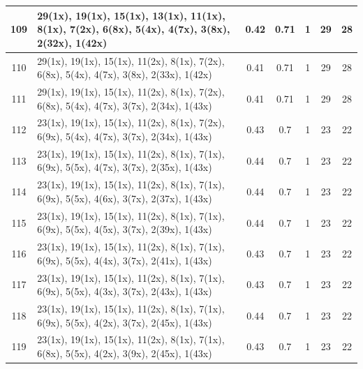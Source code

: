 \begin{small}
\begin{longtable}{|c|p{4cm}|c|c|c|c|c|}
  109 & 29(1x), 19(1x), 15(1x), 13(1x), 11(1x), 8(1x), 7(2x), 6(8x), 5(4x), 4(7x), 3(8x), 2(32x), 1(42x) & \cellcolor{colorGood}  0.42 & \cellcolor{colorGood} 0.71 & 1 & 29 & \cellcolor{colorBad} 28 \\   \hline
  110 & 29(1x), 19(1x), 15(1x), 11(2x), 8(1x), 7(2x), 6(8x), 5(4x), 4(7x), 3(8x), 2(33x), 1(42x) & \cellcolor{colorGood}  0.41 & \cellcolor{colorGood} 0.71 & 1 & 29 & \cellcolor{colorBad} 28 \\   \hline
  111 & 29(1x), 19(1x), 15(1x), 11(2x), 8(1x), 7(2x), 6(8x), 5(4x), 4(7x), 3(7x), 2(34x), 1(43x) & \cellcolor{colorGood}  0.41 & \cellcolor{colorGood} 0.71 & 1 & 29 & \cellcolor{colorBad} 28 \\   \hline
  112 & 23(1x), 19(1x), 15(1x), 11(2x), 8(1x), 7(2x), 6(9x), 5(4x), 4(7x), 3(7x), 2(34x), 1(43x) & \cellcolor{colorGood}  0.43 & \cellcolor{colorGood} 0.7 & 1 & 23 & \cellcolor{colorBad} 22 \\   \hline
  113 & 23(1x), 19(1x), 15(1x), 11(2x), 8(1x), 7(1x), 6(9x), 5(5x), 4(7x), 3(7x), 2(35x), 1(43x) & \cellcolor{colorGood}  0.44 & \cellcolor{colorGood} 0.7 & 1 & 23 & \cellcolor{colorBad} 22 \\   \hline
  114 & 23(1x), 19(1x), 15(1x), 11(2x), 8(1x), 7(1x), 6(9x), 5(5x), 4(6x), 3(7x), 2(37x), 1(43x) & \cellcolor{colorGood}  0.44 & \cellcolor{colorGood} 0.7 & 1 & 23 & \cellcolor{colorBad} 22 \\   \hline
  115 & 23(1x), 19(1x), 15(1x), 11(2x), 8(1x), 7(1x), 6(9x), 5(5x), 4(5x), 3(7x), 2(39x), 1(43x) & \cellcolor{colorGood}  0.44 & \cellcolor{colorGood} 0.7 & 1 & 23 & \cellcolor{colorBad} 22 \\   \hline
  116 & 23(1x), 19(1x), 15(1x), 11(2x), 8(1x), 7(1x), 6(9x), 5(5x), 4(4x), 3(7x), 2(41x), 1(43x) & \cellcolor{colorGood}  0.43 & \cellcolor{colorGood} 0.7 & 1 & 23 & \cellcolor{colorBad} 22 \\   \hline
  117 & 23(1x), 19(1x), 15(1x), 11(2x), 8(1x), 7(1x), 6(9x), 5(5x), 4(3x), 3(7x), 2(43x), 1(43x) & \cellcolor{colorGood}  0.43 & \cellcolor{colorGood} 0.7 & 1 & 23 & \cellcolor{colorBad} 22 \\   \hline
  118 & 23(1x), 19(1x), 15(1x), 11(2x), 8(1x), 7(1x), 6(9x), 5(5x), 4(2x), 3(7x), 2(45x), 1(43x) & \cellcolor{colorGood}  0.44 & \cellcolor{colorGood} 0.7 & 1 & 23 & \cellcolor{colorBad} 22 \\   \hline
  119 & 23(1x), 19(1x), 15(1x), 11(2x), 8(1x), 7(1x), 6(8x), 5(5x), 4(2x), 3(9x), 2(45x), 1(43x) & \cellcolor{colorGood}  0.43 & \cellcolor{colorGood} 0.7 & 1 & 23 & \cellcolor{colorBad} 22 \\   \hline

\end{longtable}
\end{small}
